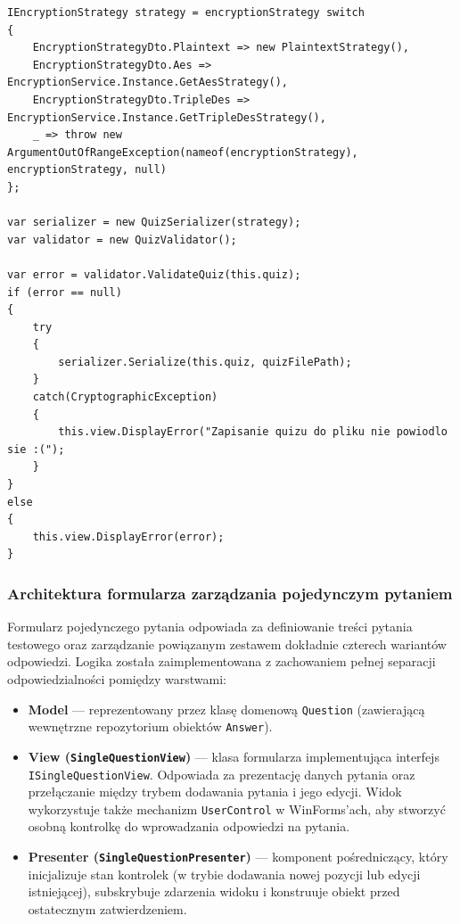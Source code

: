 \documentclass[12pt,a4paper]{article}
\begin{document}
\begin{lstlisting}[caption={Serializacja quizu}]
IEncryptionStrategy strategy = encryptionStrategy switch
{
    EncryptionStrategyDto.Plaintext => new PlaintextStrategy(),
    EncryptionStrategyDto.Aes => EncryptionService.Instance.GetAesStrategy(),
    EncryptionStrategyDto.TripleDes => EncryptionService.Instance.GetTripleDesStrategy(),
    _ => throw new ArgumentOutOfRangeException(nameof(encryptionStrategy), encryptionStrategy, null)
};

var serializer = new QuizSerializer(strategy);
var validator = new QuizValidator();

var error = validator.ValidateQuiz(this.quiz);
if (error == null)
{
    try
    {
        serializer.Serialize(this.quiz, quizFilePath);
    }
    catch(CryptographicException)
    {
        this.view.DisplayError("Zapisanie quizu do pliku nie powiodlo sie :(");
    }
}
else
{
    this.view.DisplayError(error);
}
\end{lstlisting}

\subsubsection{Architektura formularza zarządzania pojedynczym pytaniem}

Formularz pojedynczego pytania odpowiada za definiowanie treści pytania testowego oraz zarządzanie powiązanym zestawem dokładnie czterech wariantów odpowiedzi. Logika została zaimplementowana z zachowaniem pełnej separacji odpowiedzialności pomiędzy warstwami:

\begin{itemize}
    \item \textbf{Model} --- reprezentowany przez klasę domenową \texttt{Question} (zawierającą wewnętrzne repozytorium obiektów \texttt{Answer}).
    \item \textbf{View (\texttt{SingleQuestionView})} --- klasa formularza implementująca interfejs \texttt{ISingleQuestionView}. Odpowiada za prezentację danych pytania oraz przełączanie między trybem dodawania pytania i jego edycji. Widok wykorzystuje także mechanizm \verb|UserControl| w WinForms'ach, aby stworzyć osobną kontrolkę do wprowadzania odpowiedzi na pytania.
    \item \textbf{Presenter (\texttt{SingleQuestionPresenter})} --- komponent pośredniczący, który inicjalizuje stan kontrolek (w trybie dodawania nowej pozycji lub edycji istniejącej), subskrybuje zdarzenia widoku i konstruuje obiekt przed ostatecznym zatwierdzeniem.
\end{itemize}
\end{document}
